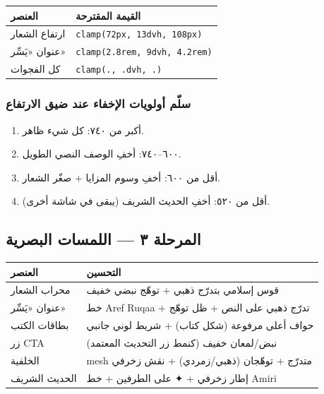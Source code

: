 \documentclass[11pt]{article}
\newcommand{\code}[1]{\textcolor{darkbg}{\texttt{\small #1}}}
\begin{document}
\begin{center}
\renewcommand{\arraystretch}{1.3}
\begin{tabular}{@{}p{5cm} p{8cm}@{}}
\toprule
\textbf{العنصر} & \textbf{القيمة المقترحة} \\
\midrule
ارتفاع الشعار & \code{clamp(72px, 13dvh, 108px)} \\
عنوان «يَسِّر» & \code{clamp(2.8rem, 9dvh, 4.2rem)} \\
كل الفجوات & \code{clamp(., .dvh, .)} \\
\bottomrule
\end{tabular}
\end{center}

\subsubsection*{سلّم أولويات الإخفاء عند ضيق الارتفاع}
\begin{enumerate}
\item أكبر من ٧٤٠: كل شيء ظاهر.
\item ٦٠٠–٧٤٠: أخفِ الوصف النصي الطويل.
\item أقل من ٦٠٠: أخفِ وسوم المزايا + صغّر الشعار.
\item أقل من ٥٢٠: أخفِ الحديث الشريف (يبقى في شاشة أخرى).
\end{enumerate}

\subsection{المرحلة ٣ — اللمسات البصرية}
\begin{center}
\renewcommand{\arraystretch}{1.3}
\begin{tabular}{@{}p{4cm} p{10cm}@{}}
\toprule
\textbf{العنصر} & \textbf{التحسين} \\
\midrule
محراب الشعار & قوس إسلامي بتدرّج ذهبي + توهّج نبضي خفيف \\
عنوان «يَسِّر» & خط Aref Ruqaa + تدرّج ذهبي على النص + ظل توهّج \\
بطاقات الكتب & حواف أعلى مرفوعة (شكل كتاب) + شريط لوني جانبي \\
زر CTA & نبض/لمعان خفيف (كنمط زر التحديث المعتمد) \\
الخلفية & mesh متدرّج + توهّجان (ذهبي/زمردي) + نقش زخرفي \\
الحديث الشريف & إطار زخرفي + ✦ على الطرفين + خط Amiri \\
\bottomrule
\end{tabular}
\end{center}
\end{document}
